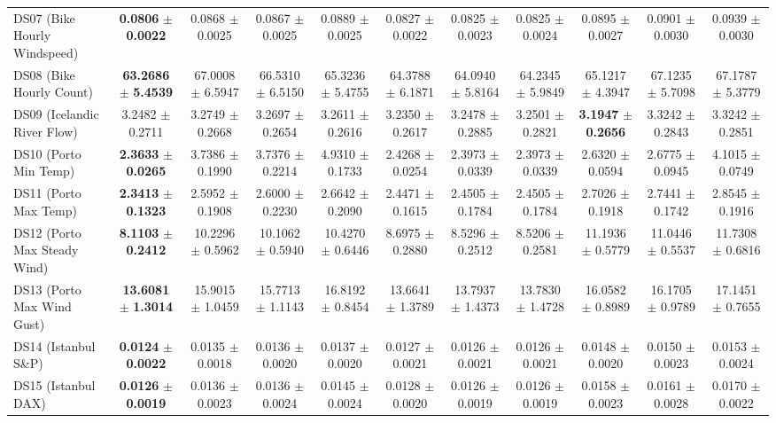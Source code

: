 \begin{table}[t]
{{\begin{tabular}{lcccccccccc}
DS07 (Bike Hourly Windspeed) & \textbf{0.0806} $\pm$ \textbf{0.0022} & 0.0868 $\pm$ 0.0025 & 0.0867 $\pm$ 0.0025 & 0.0889 $\pm$ 0.0025 & 0.0827 $\pm$ 0.0022 & 0.0825 $\pm$ 0.0023 & 0.0825 $\pm$ 0.0024 & 0.0895 $\pm$ 0.0027 & 0.0901 $\pm$ 0.0030 & 0.0939 $\pm$ 0.0030 \\
DS08 (Bike Hourly Count) & \textbf{63.2686} $\pm$ \textbf{5.4539} & 67.0008 $\pm$ 6.5947 & 66.5310 $\pm$ 6.5150 & 65.3236 $\pm$ 5.4755 & 64.3788 $\pm$ 6.1871 & 64.0940 $\pm$ 5.8164 & 64.2345 $\pm$ 5.9849 & 65.1217 $\pm$ 4.3947 & 67.1235 $\pm$ 5.7098 & 67.1787 $\pm$ 5.3779 \\
DS09 (Icelandic River Flow) & 3.2482 $\pm$ 0.2711 & 3.2749 $\pm$ 0.2668 & 3.2697 $\pm$ 0.2654 & 3.2611 $\pm$ 0.2616 & 3.2350 $\pm$ 0.2617 & 3.2478 $\pm$ 0.2885 & 3.2501 $\pm$ 0.2821 & \textbf{3.1947} $\pm$ \textbf{0.2656} & 3.3242 $\pm$ 0.2843 & 3.3242 $\pm$ 0.2851 \\
DS10 (Porto Min Temp) & \textbf{2.3633} $\pm$ \textbf{0.0265} & 3.7386 $\pm$ 0.1990 & 3.7376 $\pm$ 0.2214 & 4.9310 $\pm$ 0.1733 & 2.4268 $\pm$ 0.0254 & 2.3973 $\pm$ 0.0339 & 2.3973 $\pm$ 0.0339 & 2.6320 $\pm$ 0.0594 & 2.6775 $\pm$ 0.0945 & 4.1015 $\pm$ 0.0749 \\
DS11 (Porto Max Temp) & \textbf{2.3413} $\pm$ \textbf{0.1323} & 2.5952 $\pm$ 0.1908 & 2.6000 $\pm$ 0.2230 & 2.6642 $\pm$ 0.2090 & 2.4471 $\pm$ 0.1615 & 2.4505 $\pm$ 0.1784 & 2.4505 $\pm$ 0.1784 & 2.7026 $\pm$ 0.1918 & 2.7441 $\pm$ 0.1742 & 2.8545 $\pm$ 0.1916 \\
DS12 (Porto Max Steady Wind) & \textbf{8.1103} $\pm$ \textbf{0.2412} & 10.2296 $\pm$ 0.5962 & 10.1062 $\pm$ 0.5940 & 10.4270 $\pm$ 0.6446 & 8.6975 $\pm$ 0.2880 & 8.5296 $\pm$ 0.2512 & 8.5206 $\pm$ 0.2581 & 11.1936 $\pm$ 0.5779 & 11.0446 $\pm$ 0.5537 & 11.7308 $\pm$ 0.6816 \\
DS13 (Porto Max Wind Gust) & \textbf{13.6081} $\pm$ \textbf{1.3014} & 15.9015 $\pm$ 1.0459 & 15.7713 $\pm$ 1.1143 & 16.8192 $\pm$ 0.8454 & 13.6641 $\pm$ 1.3789 & 13.7937 $\pm$ 1.4373 & 13.7830 $\pm$ 1.4728 & 16.0582 $\pm$ 0.8989 & 16.1705 $\pm$ 0.9789 & 17.1451 $\pm$ 0.7655 \\
DS14 (Istanbul S\&P) & \textbf{0.0124} $\pm$ \textbf{0.0022} & 0.0135 $\pm$ 0.0018 & 0.0136 $\pm$ 0.0020 & 0.0137 $\pm$ 0.0020 & 0.0127 $\pm$ 0.0021 & 0.0126 $\pm$ 0.0021 & 0.0126 $\pm$ 0.0021 & 0.0148 $\pm$ 0.0020 & 0.0150 $\pm$ 0.0023 & 0.0153 $\pm$ 0.0024 \\
DS15 (Istanbul DAX) & \textbf{0.0126} $\pm$ \textbf{0.0019} & 0.0136 $\pm$ 0.0023 & 0.0136 $\pm$ 0.0024 & 0.0145 $\pm$ 0.0024 & 0.0128 $\pm$ 0.0020 & 0.0126 $\pm$ 0.0019 & 0.0126 $\pm$ 0.0019 & 0.0158 $\pm$ 0.0023 & 0.0161 $\pm$ 0.0028 & 0.0170 $\pm$ 0.0022 \\

\end{tabular}}}
\end{table}
